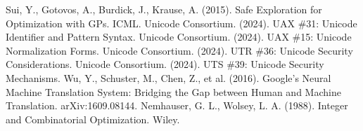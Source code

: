 \documentclass{article}
\begin{document}
\begin{thebibliography}{99}
 Sui, Y., Gotovos, A., Burdick, J., Krause, A. (2015). Safe Exploration for Optimization with GPs. ICML.
 Unicode Consortium. (2024). UAX \#31: Unicode Identifier and Pattern Syntax.
 Unicode Consortium. (2024). UAX \#15: Unicode Normalization Forms.
 Unicode Consortium. (2024). UTR \#36: Unicode Security Considerations.
 Unicode Consortium. (2024). UTS \#39: Unicode Security Mechanisms.
 Wu, Y., Schuster, M., Chen, Z., et al. (2016). Google's Neural Machine Translation System: Bridging the Gap between Human and Machine Translation. arXiv:1609.08144.
 Nemhauser, G. L., Wolsey, L. A. (1988). Integer and Combinatorial Optimization. Wiley.
\end{thebibliography}
\end{document}
